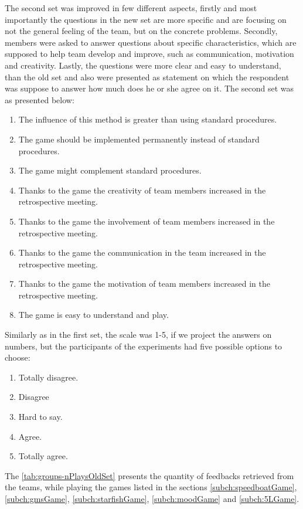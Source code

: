 The second set was improved in few different aspects, firstly and most importantly the questions in the new set are more specific and are focusing on not the general feeling of the team, but on the concrete problems. Secondly, members were asked to answer questions about specific characteristics, which are supposed to help team develop and improve, such as communication, motivation and creativity. Lastly, the questions were more clear and easy to understand, than the old set and also were presented as statement on which the respondent was suppose to answer how much does he or she agree on it.
The second set was as presented below:
\begin{enumerate}
    \item The influence of this method is greater than using standard procedures.
    \item The game should be implemented permanently instead of standard procedures.
    \item The game might complement standard procedures.
    \item Thanks to the game the creativity of team members increased in the retrospective meeting.
    \item Thanks to the game the involvement of team members increased in the retrospective meeting.
    \item Thanks to the game the communication in the team increased in the retrospective meeting.
    \item Thanks to the game the motivation of team members increased in the retrospective meeting.
    \item The game is easy to understand and play.
\end{enumerate}
Similarly as in the first set, the scale was 1-5, if we project the answers on numbers, but the participants of the experiments had five possible options to choose:
\begin{enumerate}
    \item Totally disagree.
    \item Disagree
    \item Hard to say.
    \item Agree.
    \item Totally agree.
\end{enumerate}

The \autoref{tab:groups-nPlaysOldSet} presents the quantity of feedbacks retrieved from the teams, while playing the games listed in the sections \ref{subch:speedboatGame},\ref{subch:gmsGame}, \ref{subch:starfishGame}, \ref{subch:moodGame} and \ref{subch:5LGame}.
\newline


